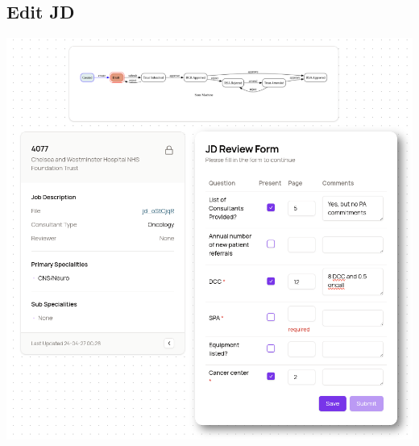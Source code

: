 \begin{appendices}
\subsection{Edit JD} \label{app:EditJD}
\includegraphics[width=\textwidth]{images/jd-form.png}


\end{appendices}
